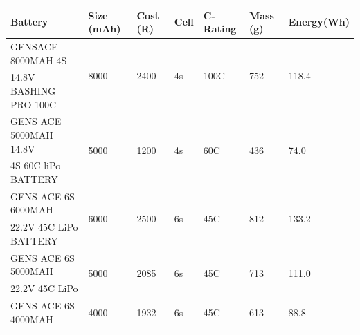 	\begin{table}[H]
		\begin{center}
				\begin{tabular}{|lllllll|}
				\hline
				\multicolumn{1}{|l|}{Battery}      & \multicolumn{1}{l|}{Size (mAh)} & \multicolumn{1}{l|}{Cost (R)} & \multicolumn{1}{l|}{Cell} & \multicolumn{1}{l|}{C-Rating} & \multicolumn{1}{l|}{Mass (g)} & Energy(Wh)\\ \hline
				GENSACE 8000MAH 4S   & \multirow{2}{*}{8000}           & \multirow{2}{*}{2400}         & \multirow{2}{*}{4s}       & \multirow{2}{*}{100C}         & \multirow{2}{*}{752} &  \multirow{2}{*}{118.4}\\
				14.8V BASHING PRO 100C                           &                                 &                               &                           &                               &           &             \\ \hline
				GENS ACE 5000MAH 14.8V & \multirow{2}{*}{5000}           & \multirow{2}{*}{1200}         & \multirow{2}{*}{4s}       & \multirow{2}{*}{60C}          & \multirow{2}{*}{436}  & \multirow{2}{*}{74.0}\\
				4S 60C liPo BATTERY                            &                                 &                               &                           &                               &              &          \\ \hline
				GENS ACE 6S 6000MAH & \multirow{2}{*}{6000}           & \multirow{2}{*}{2500}         & \multirow{2}{*}{6s}       & \multirow{2}{*}{45C}          & \multirow{2}{*}{812}  & \multirow{2}{*}{133.2}\\
				22.2V 45C LiPo BATTERY                            &                                 &                               &                           &                               &          &              \\ \hline
				GENS ACE 6S 5000MAH & \multirow{2}{*}{5000}           & \multirow{2}{*}{2085}         & \multirow{2}{*}{6s}       & \multirow{2}{*}{45C}          & \multirow{2}{*}{713}    &  \multirow{2}{*}{111.0}             \\
				22.2V 45C LiPo                            &                                 &                               &                           &                               &               &         \\ \hline
				GENS ACE 6S 4000MAH & \multirow{2}{*}{4000}           & \multirow{2}{*}{1932}         & \multirow{2}{*}{6s}       & \multirow{2}{*}{45C}          & \multirow{2}{*}{613}    &  \multirow{2}{*}{88.8}             \\

\end{tabular}
\end{center}
\end{table}
